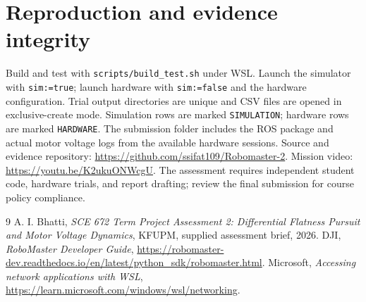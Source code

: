 \documentclass[11pt,a4paper]{article}
\begin{document}
\section{Reproduction and evidence integrity}
Build and test with \texttt{scripts/build\_test.sh} under WSL. Launch the simulator with \texttt{sim:=true}; launch hardware with \texttt{sim:=false} and the hardware configuration. Trial output directories are unique and CSV files are opened in exclusive-create mode. Simulation rows are marked \texttt{SIMULATION}; hardware rows are marked \texttt{HARDWARE}. The submission folder includes the ROS package and actual motor voltage logs from the available hardware sessions. Source and evidence repository: \url{https://github.com/ssifat109/Robomaster-2}. Mission video: \url{https://youtu.be/K2ukuONWcgU}. The assessment requires independent student code, hardware trials, and report drafting; review the final submission for course policy compliance.

\begin{thebibliography}{9}
 A. I. Bhatti, \emph{SCE 672 Term Project Assessment 2: Differential Flatness Pursuit and Motor Voltage Dynamics}, KFUPM, supplied assessment brief, 2026.
 DJI, \emph{RoboMaster Developer Guide}, \url{https://robomaster-dev.readthedocs.io/en/latest/python_sdk/robomaster.html}.
 Microsoft, \emph{Accessing network applications with WSL}, \url{https://learn.microsoft.com/windows/wsl/networking}.
\end{thebibliography}
\end{document}
